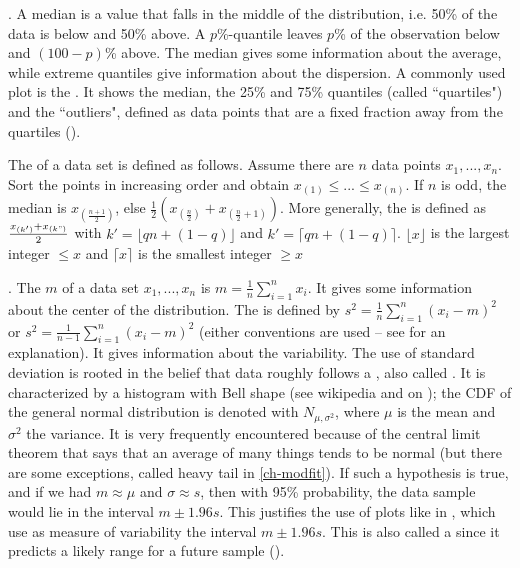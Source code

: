 . A median is a value
that falls in
    the middle of the distribution, i.e. 50\% of the data is below
    and 50\% above.
A $p$\%-quantile leaves $p$\% of the observation below and
$(100-p)$\% above.
    The median gives some information about the average, while extreme
quantiles give information about the dispersion. A commonly
used plot is the . It shows the median, the 25\%
and 75\% quantiles (called ``quartiles") and the ``outliers",
defined as data points that are a fixed fraction away from the
quartiles ().
\begin{petit}
The  of a data set is defined
as follows. Assume there are $n$ data points
$x_1,..., x_n$. Sort the points in increasing
order and obtain $x_{(1)}\leq ...\leq x_{(n)}$.
If $n$ is odd, the median is
$x_{(\frac{n+1}{2})}$, else
$\frac{1}{2}(x_{(\frac{n}{2})}+x_{(\frac{n}{2}+1)})$.
More generally, the  is
defined as $\frac{x_{(k')}+x_{(k")}}{2}$ with
$k'=\lfloor qn+(1-q)\rfloor$ and $k'=\lceil
qn+(1-q)\rceil$. $\lfloor x \rfloor$ is the
largest integer $\leq x$ and $\lceil x \rceil$ is
the smallest integer $\geq x$ 
\end{petit}

. The  $m$ of a data
set $x_1,..., x_n$ is $m=\frac{1}{n}\sum_{i=1}^n x_i$. It gives
some information about the center of the distribution. The
 is defined by
$s^2=\frac{1}{n}\sum_{i=1}^n \left(x_i- m\right)^2$ or
$s^2=\frac{1}{n-1}\sum_{i=1}^n \left(x_i- m\right)^2$ (either
conventions are used -- see  for an
explanation). It gives information about the variability. The
use of standard deviation is rooted in the belief that data
roughly follows a \label{def-normal},
also called . It is characterized by
a histogram with Bell shape (see wikipedia and
 on ); the CDF of the
general normal distribution is denoted with $N_{\mu,\sigma^2}$,
where $\mu$ is the mean and $\sigma^2$ the variance. It is very
frequently encountered because of the central limit theorem
that says that an average of many things tends to be normal
(but there are some exceptions, called heavy tail in
\cref{ch-modfit}). If such a hypothesis is true, and if we had
$m\approx\mu$ and $\sigma\approx s$, then with 95\%
probability, the data sample would lie in the interval $m \pm
1.96 s$. This justifies the use of  plots
like in , which use as measure of
variability the interval $m \pm 1.96 s$. This is also called a
 since it predicts a likely range for a
future sample ().

